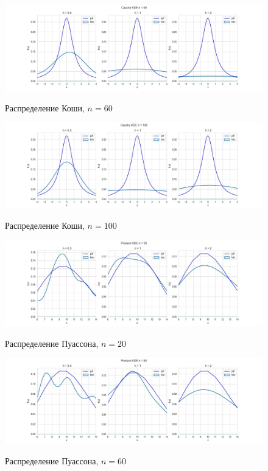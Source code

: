 \begin{figure}[H]
	{\includegraphics[scale=0.45]{task_4/resource/Cauchy KDE60.jpg}}
		\caption{Распределение Коши, $n=60$} 
		\label{fig:normal}
	\end{figure}
	
\begin{figure}[H]
	{\includegraphics[scale=0.45]{task_4/resource/Cauchy KDE100.jpg}}
		\caption{Распределение Коши, $n=100$} 
		\label{fig:normal}
	\end{figure}

\begin{figure}[H]
	{\includegraphics[scale=0.45]{task_4/resource/Poisson KDE20.jpg}}
		\caption{Распределение Пуассона, $n=20$} 
		\label{fig:normal}
	\end{figure}
	
\begin{figure}[H]
	{\includegraphics[scale=0.45]{task_4/resource/Poisson KDE60.jpg}}
		\caption{Распределение Пуассона, $n=60$} 
		\label{fig:normal}
	\end{figure}
	
